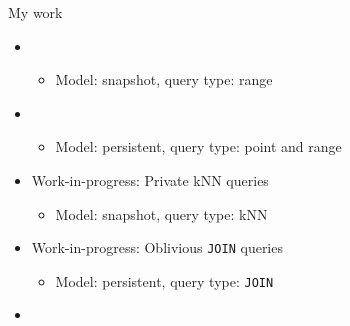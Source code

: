 	\begin{frame}{My work}

		\begin{itemize}[label={}]
			\item<1> 

				\begin{itemize}[label={}]
					\item \small Model: \alert{snapshot}, query type: \alert{range} \normalsize
				\end{itemize}

			\item<2> 

				\begin{itemize}[label={}]
					\item \small Model: \alert{persistent}, query type: \alert{point} and \alert{range} \normalsize
				\end{itemize}

			\item<3> Work-in-progress: Private kNN queries

			\begin{itemize}[label={}]
				\item \small Model: \alert{snapshot}, query type: \alert{kNN} \normalsize
			\end{itemize}

			\item<4> Work-in-progress: Oblivious \texttt{JOIN} queries

			\begin{itemize}[label={}]
				\item \small Model: \alert{persistent}, query type: \alert{\texttt{JOIN}} \normalsize
			\end{itemize}

			\item<5> 

		\end{itemize}

	\end{frame}
